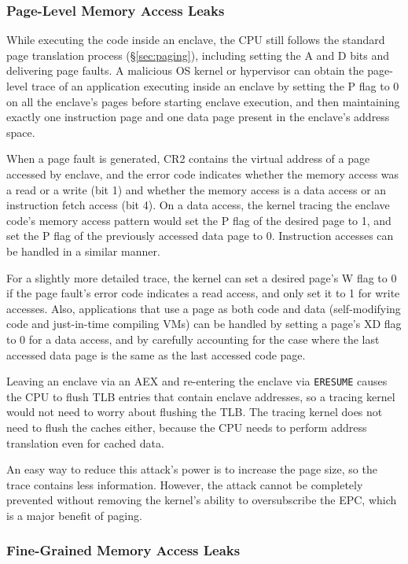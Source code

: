 \subsubsection{Page-Level Memory Access Leaks}

While executing the code inside an enclave, the CPU still follows the standard
page translation process (\S \ref{sec:paging}), including setting the A and D
bits and delivering page faults. A malicious OS kernel or hypervisor can
obtain the page-level trace of an application executing inside an enclave by
setting the P flag to 0 on all the enclave's pages before starting enclave
execution, and then maintaining exactly one instruction page and one data page
present in the enclave's address space.

When a page fault is generated, CR2 contains the virtual address of a page
accessed by enclave, and the error code indicates whether the memory access was
a read or a write (bit 1) and whether the memory access is a data access or
an instruction fetch access (bit 4). On a data access, the kernel tracing the
enclave code's memory access pattern would set the P flag of the desired page
to 1, and set the P flag of the previously accessed data page to 0. Instruction
accesses can be handled in a similar manner.

For a slightly more detailed trace, the kernel can set a desired page's W flag
to 0 if the page fault's error code indicates a read access, and only set it to
1 for write accesses. Also, applications that use a page as both code and data
(self-modifying code and just-in-time compiling VMs) can be handled by setting
a page's XD flag to 0 for a data access, and by carefully accounting for the
case where the last accessed data page is the same as the last accessed code
page.

Leaving an enclave via an AEX and re-entering the enclave via \texttt{ERESUME}
causes the CPU to flush TLB entries that contain enclave addresses, so a
tracing kernel would not need to worry about flushing the TLB. The tracing
kernel does not need to flush the caches either, because the CPU needs to
perform address translation even for cached data.

An easy way to reduce this attack's power is to increase the page size, so the
trace contains less information. However, the attack cannot be completely
prevented without removing the kernel's ability to oversubscribe the EPC,
which is a major benefit of paging.

\subsubsection{Fine-Grained Memory Access Leaks}

